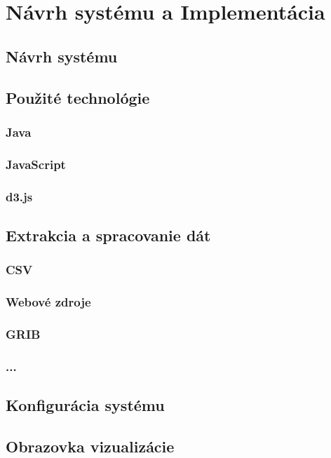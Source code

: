 \chapter{Návrh systému a Implementácia}


\section{Návrh systému}


\section{Použité technológie}

\subsection{Java}

\subsection{JavaScript}

\subsection{d3.js}



\section{Extrakcia a spracovanie dát}

\subsection{CSV}

\subsection{Webové zdroje}

\subsection{GRIB}

\subsection{...}

\section{Konfigurácia systému}


\section{Obrazovka vizualizácie}